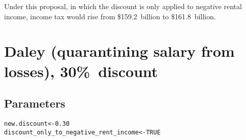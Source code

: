 \documentclass{grattan}\usepackage[]{graphicx}\usepackage[]{color}
\makeatletter
\newcommand{\hlnum}[1]{\textcolor[rgb]{0.686,0.059,0.569}{#1}}%
\newcommand{\hlstd}[1]{\textcolor[rgb]{0.345,0.345,0.345}{#1}}%
\newcommand{\hlkwb}[1]{\textcolor[rgb]{0.69,0.353,0.396}{#1}}%
\newenvironment{kframe}{%
 \def\at@end@of@kframe{}%
 \ifinner\ifhmode%
  \def\at@end@of@kframe{\end{minipage}}%
  \begin{minipage}{\columnwidth}%
 \fi\fi%
 \def\FrameCommand##1{\hskip\@totalleftmargin \hskip-\fboxsep
 \colorbox{shadecolor}{##1}\hskip-\fboxsep
     \hskip-\linewidth \hskip-\@totalleftmargin \hskip\columnwidth}%
 \MakeFramed {\advance\hsize-\width
   \@totalleftmargin\z@ \linewidth\hsize
   \@setminipage}}%
 {\par\unskip\endMakeFramed%
 \at@end@of@kframe}
\newenvironment{knitrout}{}{} %
\makeatother
\begin{document}
Under this proposal, in which the discount is only applied to negative rental income, income tax would rise from \$159.2~billion to \$161.8~billion.

\section{Daley (quarantining salary from losses), 30\%\ discount}
\subsection{Parameters}
\begin{knitrout}
\color{fgcolor}\begin{kframe}
\begin{alltt}
\hlstd{new.discount} \hlkwb{<-} \hlnum{0.30}
\hlstd{discount_only_to_negative_rent_income} \hlkwb{<-} \hlnum{TRUE}
\end{alltt}
\end{kframe}
\end{knitrout}
\end{document}
